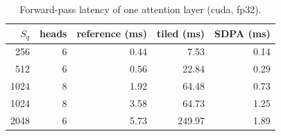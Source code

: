 \begin{table}[t]
\centering
\caption{Forward-pass latency of one attention layer (cuda, fp32).}
\label{tab:attention}
\begin{tabular}{rrrrr}
\toprule
$S_q$ & heads & reference (ms) & tiled (ms) & SDPA (ms) \\
\midrule
256 & 6 & 0.44 & 7.53 & 0.14 \\
512 & 6 & 0.56 & 22.84 & 0.29 \\
1024 & 8 & 1.92 & 64.48 & 0.73 \\
1024 & 8 & 3.58 & 64.73 & 1.25 \\
2048 & 6 & 5.73 & 249.97 & 1.89 \\
\bottomrule
\end{tabular}
\end{table}
